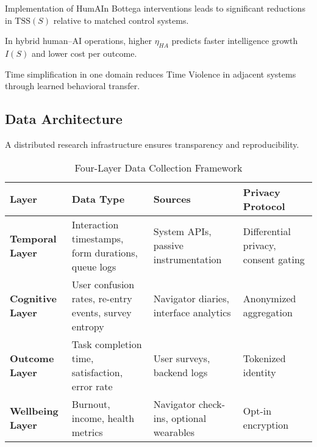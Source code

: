 \begin{hypothesis}[Causality]
\label{hyp:causality}
Implementation of HumAIn Bottega interventions leads to significant reductions in $\text{TSS}(S)$ relative to matched control systems.
\end{hypothesis}

\begin{hypothesis}
\label{hyp:transfer}
In hybrid human–AI operations, higher $\eta_{HA}$ predicts faster intelligence growth $I(S)$ and lower cost per outcome.
\end{hypothesis}

\begin{hypothesis}
\label{hyp:spillover}
Time simplification in one domain reduces Time Violence in adjacent systems through learned behavioral transfer.
\end{hypothesis}

\subsection{Data Architecture}
\label{sec:data-architecture}

A distributed research infrastructure ensures transparency and reproducibility.

\begin{table}[h]
\centering
\caption{Four-Layer Data Collection Framework}
\label{tab:data-architecture}
\begin{tabular}{p{3cm}p{3cm}p{3cm}p{3cm}}
\toprule
\textbf{Layer} & \textbf{Data Type} & \textbf{Sources} & \textbf{Privacy Protocol} \\
\midrule
\textbf{Temporal Layer} & Interaction timestamps, form durations, queue logs & System APIs, passive instrumentation & Differential privacy, consent gating \\
\addlinespace
\textbf{Cognitive Layer} & User confusion rates, re-entry events, survey entropy & Navigator diaries, interface analytics & Anonymized aggregation \\
\addlinespace
\textbf{Outcome Layer} & Task completion time, satisfaction, error rate & User surveys, backend logs & Tokenized identity \\
\addlinespace
\textbf{Wellbeing Layer} & Burnout, income, health metrics & Navigator check-ins, optional wearables & Opt-in encryption \\
\bottomrule
\end{tabular}
\end{table}

